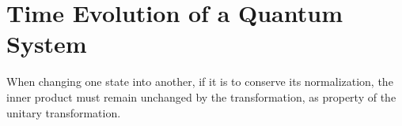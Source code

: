 


\section{Time Evolution of a Quantum System}
When changing one state into another, if it is to conserve its normalization, the inner product must remain unchanged by the transformation, as property of the unitary transformation. 

